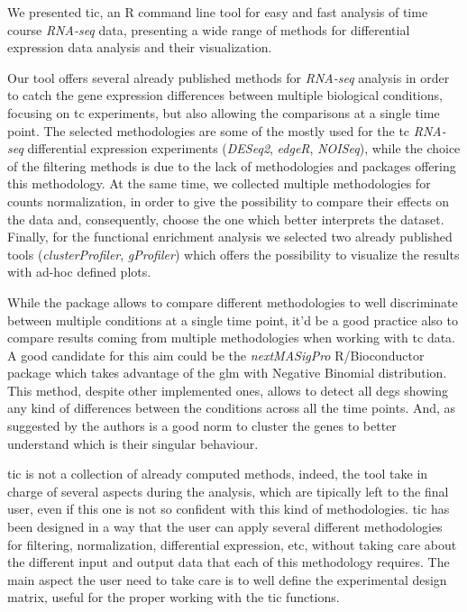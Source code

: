 We presented \gls{tic}, an R command line tool for easy and fast analysis of time course \textit{RNA-seq} data, presenting a wide range of methods for differential expression data analysis and their visualization.

Our tool offers several already published methods for \textit{RNA-seq} analysis in order to catch the gene expression differences between multiple biological conditions, focusing on \gls{tc} experiments, but also allowing the comparisons at a single time point.
The selected methodologies are some of the mostly used for the \gls{tc} \textit{RNA-seq} differential expression experiments (\textit{DESeq2}, \textit{edgeR}, \textit{NOISeq}), while the choice of the filtering methods is due to the lack of methodologies and packages offering this methodology.
At the same time, we collected multiple methodologies for counts normalization, in order to give the possibility to compare their effects on the data and, consequently, choose the one which better interprets the dataset.
Finally, for the functional enrichment analysis we selected two already published tools (\textit{clusterProfiler}, \textit{gProfiler}) which offers the possibility to visualize the results with ad-hoc defined plots.

While the package allows to compare different methodologies to well discriminate between multiple conditions at a single time point, it'd be a good practice also to compare results coming from multiple methodologies when working with \gls{tc} data.
A good candidate for this aim could be the \textit{nextMASigPro} R/Bioconductor package which takes advantage of the \gls{glm} with Negative Binomial distribution.
This method, despite other implemented ones, allows to detect all \glspl{deg} showing any kind of differences between the conditions across all the time points.
And, as suggested by the authors is a good norm to cluster the genes to better understand which is their singular behaviour.

\gls{tic} is not a collection of already computed methods, indeed, the tool take in charge of several aspects during the analysis, which are tipically left to the final user, even if this one is not so confident with this kind of methodologies.
\gls{tic} has been designed in a way that the user can apply several different methodologies for filtering, normalization, differential expression, etc, without taking care about the different input and output data that each of this methodology requires.
The main aspect the user need to take care is to well define the experimental design matrix, useful for the proper working with the \gls{tic} functions.

